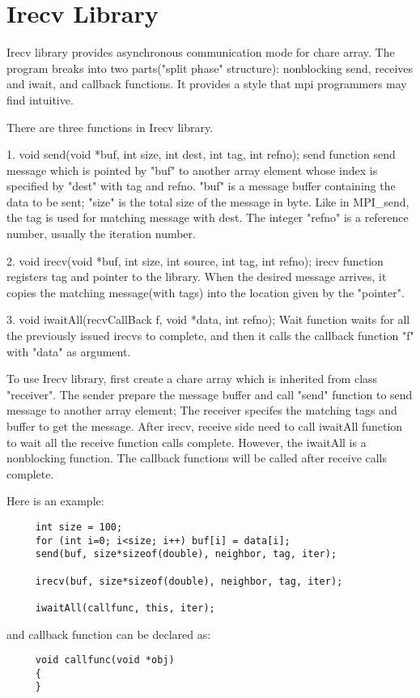 \section{Irecv Library}

{\sc Irecv} library provides asynchronous communication mode for chare array. The program breaks into two parts("split phase" structure): nonblocking send, receives and iwait, and callback functions. It provides a style that mpi programmers may find intuitive. 

There are three functions in Irecv library.

1. void send(void *buf, int size, int dest, int tag, int refno);
send function send message which is pointed by "buf" to another array element whose index is specified by "dest" with tag and refno.
"buf" is a message buffer containing the data to be sent; "size" is the total size of the message in byte. 
Like in MPI\_send, the tag is used for matching message with dest. The integer "refno" is a reference number, usually the iteration number.
  

2. void irecv(void *buf, int size, int source, int tag, int refno);
irecv function registers tag and pointer to the library. When the desired message arrives, it copies the matching message(with tags) into the location given by the "pointer".

3. void iwaitAll(recvCallBack f, void *data, int refno);
Wait function waits for all the previously issued irecvs to complete, and then it calls the callback function "f" with "data" as argument.

To use Irecv library, first create a chare array which is inherited from class "receiver". The sender prepare the message buffer and call "send" function to send message to another array element; The receiver specifes the matching tags and buffer to get the message. After irecv, receive side need to call iwaitAll function to wait all the receive function calls complete. However, the iwaitAll is a nonblocking function. The callback functions will be called after receive calls complete.

Here is an example:

\begin{verbatim}
     int size = 100;
     for (int i=0; i<size; i++) buf[i] = data[i];
     send(buf, size*sizeof(double), neighbor, tag, iter);

     irecv(buf, size*sizeof(double), neighbor, tag, iter);

     iwaitAll(callfunc, this, iter);
\end{verbatim}

and callback function can be declared as:

\begin{verbatim}
     void callfunc(void *obj)
     {
     }
\end{verbatim}
